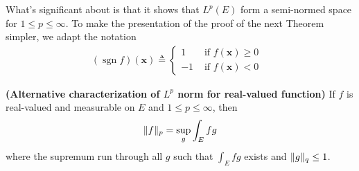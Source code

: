 \documentclass{report}
\begin{document}
\begin{mdframed}
What's significant about  is that it shows that $L^{p}(E)$ form a semi-normed space for $1\leq p\leq \infty$. To make the presentation of the proof of the next Theorem simpler, we adapt the notation 
\begin{align*}
  (\operatorname{sgn}f)(\textbf{x})\triangleq \begin{cases}
    1& \text{ if $f(\textbf{x})\geq 0$ }\\
    -1& \text{ if $f(\textbf{x})<0$ }
  \end{cases}
\end{align*}
\end{mdframed}
\begin{theorem}
\textbf{(Alternative characterization of $L^p$ norm for real-valued function)} If $f$ is real-valued and measurable on  $E$ and  $1\leq p\leq \infty$, then 
\begin{align*}
\| f \|_p = \sup_g \int_E fg
\end{align*}
where the supremum run through all $g$ such that  $\int_E fg$ exists and $\| g \|_q \leq 1$. 
\end{theorem}
\end{document}
